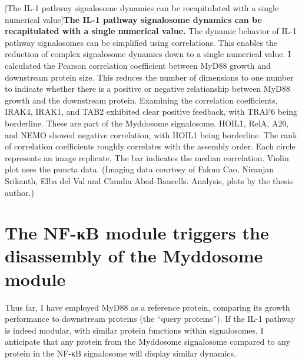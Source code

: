 \begin{centering}
\captionsetup{parbox=none}
[The IL-1 pathway signalosome dynamics can be recapitulated with a single numerical value]{\textbf{The IL-1 pathway signalosome dynamics can be recapitulated with a single numerical value.} The dynamic behavior of IL-1 pathway signalosomes can be simplified using correlations. This enables the reduction of complex signalosome dynamics down to a single numerical value. I calculated the Pearson correlation coefficient between MyD88 growth and downstream protein size. This reduces the number of dimensions to one number to indicate whether there is a positive or negative relationship between MyD88 growth and the downstream protein. Examining the correlation coefficients, IRAK4, IRAK1, and TAB2 exhibited clear positive feedback, with TRAF6 being borderline. These are part of the Myddosome signalosome. HOIL1, RelA, A20, and NEMO showed negative correlation, with HOIL1 being borderline. The rank of correlation coefficients roughly correlates with the assembly order. Each circle represents an image replicate. The bar indicates the median correlation. Violin plot uses the puncta data. (Imaging data courtesy of Fakun Cao, Niranjan Srikanth, Elba del Val and Claudia Abad-Baucells. Analysis, plots by the thesis author.)}
\label{p2:5b}
\end{centering}

\section{The NF-κB module triggers the disassembly of the Myddosome module}
\label{section:disassembly_results}
Thus far, I have employed MyD88 as a reference protein, comparing its growth performance to downstream proteins (the “query proteins”). If the IL-1 pathway is indeed modular, with similar protein functions within signalosomes, I anticipate that any protein from the Myddosome signalosome compared to any protein in the NF-κB signalosome will display similar dynamics.

